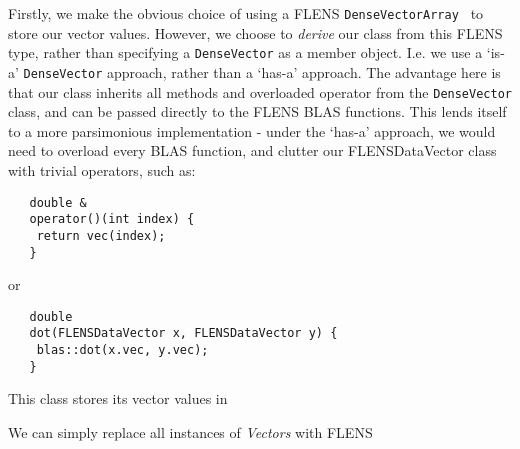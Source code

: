Firstly, we make the obvious choice of using a FLENS \texttt{DenseVector\<Array\<\double\> \>} to store our vector values. However, we choose to \emph{derive} our class from this FLENS type, rather than specifying a \texttt{DenseVector} as a member object. I.e. we use a `is-a' \texttt{DenseVector} approach, rather than a `has-a' approach. The advantage here is that our class inherits all methods and overloaded operator from the \texttt{DenseVector} class, and can be passed directly to the FLENS BLAS functions. This lends itself to a more parsimonious implementation - under the `has-a' approach, we would need to overload every BLAS function, and clutter our FLENSDataVector class with trivial operators, such as:

\begin{lstlisting}
   double &
   operator()(int index) {
   	return vec(index);
   }
\end{lstlisting}

or

\begin{lstlisting}
   double
   dot(FLENSDataVector x, FLENSDataVector y) {
   	blas::dot(x.vec, y.vec);
   }
\end{lstlisting}

This class stores its vector values in 



We can simply replace all instances of \emph{Vectors} with FLENS 